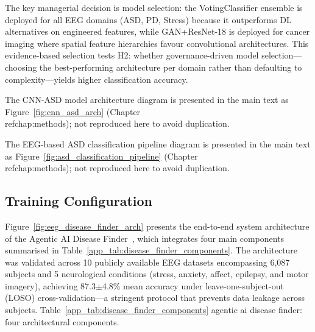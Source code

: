 The key managerial decision is model selection: the VotingClassifier ensemble is deployed for all EEG domains (ASD, PD, Stress) because it outperforms DL alternatives on engineered features, while GAN+ResNet-18 is deployed for cancer imaging where spatial feature hierarchies favour convolutional architectures. This evidence-based selection tests H2: whether governance-driven model selection---choosing the best-performing architecture per domain rather than defaulting to complexity---yields higher classification accuracy.

\label{app_fig:cnn_lstm_arch}

\noindent The CNN-ASD model architecture diagram is presented in the main text as Figure~\ref{fig:cnn_asd_arch} (Chapter~\\ref{chap:methods}); not reproduced here to avoid duplication.

\noindent The EEG-based ASD classification pipeline diagram is presented in the main text as Figure~\ref{fig:asd_classification_pipeline} (Chapter~\\ref{chap:methods}); not reproduced here to avoid duplication.


\subsection{Training Configuration}
\label{app:sec6_training}


Figure~\ref{fig:eeg_disease_finder_arch} presents the end-to-end system architecture of the Agentic AI Disease Finder~\cite{asthana2025eegmaster}, which integrates four main components summarised in Table~\ref{app_tab:disease_finder_components}. The architecture was validated across 10 publicly available EEG datasets encompassing 6,087 subjects and 5 neurological conditions (stress, anxiety, affect, epilepsy, and motor imagery), achieving 87.3$\pm$4.8\% mean accuracy under leave-one-subject-out (LOSO) cross-validation---a stringent protocol that prevents data leakage across subjects.
\noindent Table~\ref{app_tab:disease_finder_components} agentic ai disease finder: four architectural components.

